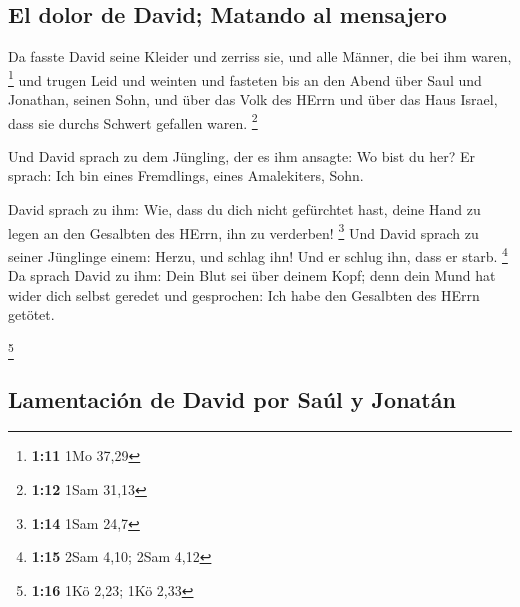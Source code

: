 \hypertarget{el-dolor-de-david-matando-al-mensajero}{%
\subsection{El dolor de David; Matando al
mensajero}\label{el-dolor-de-david-matando-al-mensajero}}

 Da fasste David seine Kleider und zerriss sie, und alle
Männer, die bei ihm waren, \footnote{\textbf{1:11} 1Mo 37,29}
 und trugen Leid und weinten und fasteten bis an den
Abend über Saul und Jonathan, seinen Sohn, und über das Volk des HErrn
und über das Haus Israel, dass sie durchs Schwert gefallen waren.
\footnote{\textbf{1:12} 1Sam 31,13}

 Und David sprach zu dem Jüngling, der es ihm ansagte: Wo
bist du her? Er sprach: Ich bin eines Fremdlings, eines Amalekiters,
Sohn.

 David sprach zu ihm: Wie, dass du dich nicht gefürchtet
hast, deine Hand zu legen an den Gesalbten des HErrn, ihn zu verderben!
\footnote{\textbf{1:14} 1Sam 24,7}  Und David sprach zu
seiner Jünglinge einem: Herzu, und schlag ihn! Und er schlug ihn, dass
er starb. \footnote{\textbf{1:15} 2Sam 4,10; 2Sam 4,12} 
Da sprach David zu ihm: Dein Blut sei über deinem Kopf; denn dein Mund
hat wider dich selbst geredet und gesprochen: Ich habe den Gesalbten des
HErrn getötet.

\footnote{\textbf{1:16} 1Kö 2,23; 1Kö 2,33}

\hypertarget{lamentaciuxf3n-de-david-por-sauxfal-y-jonatuxe1n}{%
\subsection{Lamentación de David por Saúl y
Jonatán}\label{lamentaciuxf3n-de-david-por-sauxfal-y-jonatuxe1n}}

